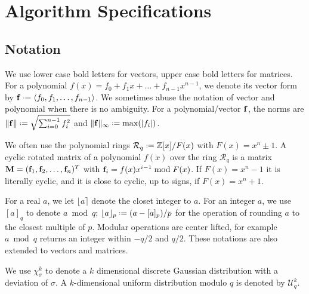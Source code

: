 \documentclass{llncs}
\newcommand{\Rcal}{{\mathcal R}}
\newcommand{\ZZ}{\mathbb{Z}}
\newcommand{\bff}{{\bf f}}
\newcommand{\bfM}{{\bf M}}
\newcommand{\<}{\langle}
\renewcommand{\>}{\rangle}
\newcommand*{\defeq}{\mathrel{\vcenter{\baselineskip0.5ex \lineskiplimit0pt
                     \hbox{\scriptsize.}\hbox{\scriptsize.}}}%
                     =}
\begin{document}
\section{Algorithm Specifications}%
\subsection{Notation}
We use lower case bold letters for vectors, upper case bold letters for matrices.
For a polynomial $f(x) = f_0+f_1x+\dots+ f_{n-1}x^{n-1}$, 
we denote its vector form by $\bff \defeq \left<f_0, f_1, \dots, f_{n-1}\right>$.  We sometimes abuse the notation of vector and polynomial when there is no ambiguity.
For a polynomial/vector $\bff$, the norms are $\|\bff\| \defeq \sqrt{\sum_{i=0}^{n-1}f_i^2}$ and $\|\bff\|_\infty \defeq \max(|f_i|)$. 

We often use the polynomial rings $\Rcal_q \defeq \ZZ[x]/F(x)$ with $F(x) = x^n\pm 1$. %
A cyclic rotated matrix of a polynomial $f(x)$ over the ring $\Rcal_q$
is a matrix $\bfM = (\bff_1,\bff_2,\dots,\bff_n)^T$ with $\bff_i = f(x)x^{i-1}\bmod F(x)$.
If  $F(x) = x^n- 1$ it is literally cyclic, and it is close to cyclic, up to signs, if $F(x) = x^n + 1$.

For a real $a$, we let 
$\lfloor a\rceil$ denote the closet integer to $a$.
 For an integer $a$, we use
$[a]_q$ to denote $a\bmod q$; $\lfloor a\rfloor_p \defeq (a - [a]_p )/p$ for the operation of rounding $a$ to the closest multiple of $p$. 
Modular operations are center lifted, for example $a\bmod q$ returns an integer within $-q/2$ and $q/2$. These notations are also extended to vectors and matrices.

We use $\chi_\sigma^k$ to denote a $k$ dimensional
discrete Gaussian distribution with a deviation of
$\sigma$. A $k$-dimensional uniform distribution
modulo $q$ is denoted by $\mathcal{U}_q^k$.
\end{document}
